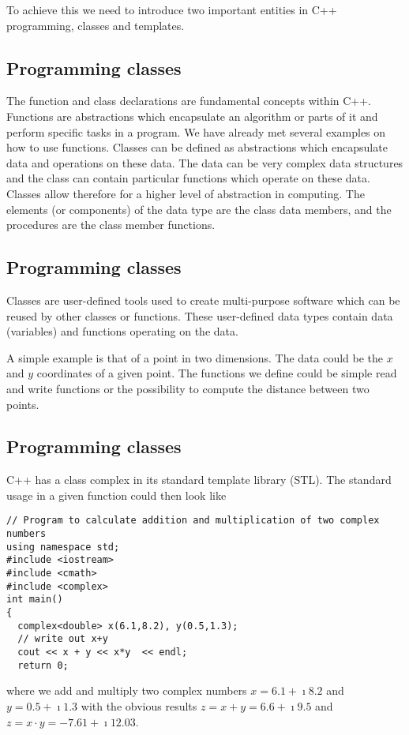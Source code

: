 \documentclass[%
oneside,                 %
final,                   %
10pt]{article}
\begin{document}
To achieve this we need to introduce two important entities in C++ programming, classes and templates.

\subsection*{Programming classes}

The function and class declarations are fundamental concepts within C++.  Functions are abstractions
which encapsulate an algorithm or parts of it and perform specific tasks in a program.
We have already met several examples on how to use  functions.
Classes can be defined as abstractions which encapsulate
data and operations on these data.
The data can be very complex data structures  and the class can contain particular functions
which operate on these data. Classes allow therefore for a higher level of abstraction in computing.
The elements (or components) of the data
type are the class data members, and the procedures are the class
member functions.

\subsection*{Programming classes}

Classes are user-defined tools used to create multi-purpose software which can be reused by other classes or functions.
These user-defined data types contain data (variables) and
functions operating on the data.

A simple example is that of a point in two dimensions.
The data could be the $x$ and $y$ coordinates of a given  point. The functions
we define could be simple read and write functions or the possibility to compute the distance between two points.

\subsection*{Programming classes}

C++ has a class complex in its standard
template library (STL). The standard usage in a given function could then look like

\begin{verbatim}
// Program to calculate addition and multiplication of two complex numbers
using namespace std;
#include <iostream>
#include <cmath>
#include <complex>
int main()
{
  complex<double> x(6.1,8.2), y(0.5,1.3);
  // write out x+y
  cout << x + y << x*y  << endl;
  return 0;

\end{verbatim}
where we add and multiply two complex numbers $x=6.1+\imath 8.2$ and $y=0.5+\imath 1.3$ with the obvious results
$z=x+y=6.6+\imath 9.5$ and $z=x\cdot y= -7.61+\imath 12.03$.
\end{document}
